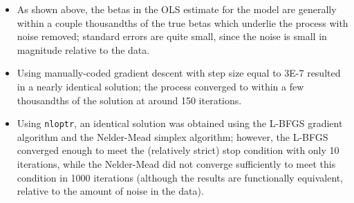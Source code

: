 \documentclass{article}
\begin{document}
\begin{itemize}
	\item As shown above, the betas in the OLS estimate for the model are generally within a couple thousandths of the true betas which underlie the process with noise removed; standard errors are quite small, since the noise is small in magnitude relative to the data.
	\item Using manually-coded gradient descent with step size equal to 3E-7 resulted in a nearly identical solution; the process converged to within a few thousandths of the solution at around 150 iterations.
	\item Using \texttt{nloptr}, an identical solution was obtained using the L-BFGS gradient algorithm and the Nelder-Mead simplex algorithm; however, the L-BFGS converged enough to meet the (relatively strict) stop condition with only 10 iterations, while the Nelder-Mead did not converge sufficiently to meet this condition in 1000 iterations (although the results are functionally equivalent, relative to the amount of noise in the data).
\end{itemize}
\end{document}
